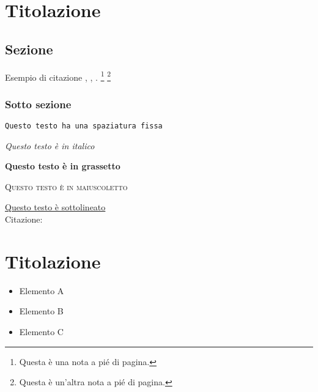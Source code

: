 \documentclass[twoside]{supsistudent}
\begin{document}
\maketitle
\onehalfspacing
\frontmatter


\tableofcontents
\listoffigures					%
\listoftables					%

\newpage
\mainmatter
{}
\setcounter{page}{1}

\chapter{Titolazione}

\lipsum[13]

\section{Sezione}

\lipsum[23]
Esempio di citazione \cite{4538384}, \cite{5357331,4523385}, \cite{1705631}.
\footnote{Questa \`e una nota a pi\'e di pagina.}
\footnote{Questa \`e un'altra nota a pi\'e di pagina.}
\lipsum[23]

\subsection{Sotto sezione}

\texttt{Questo testo ha una spaziatura fissa}

\textit{Questo testo \`e in italico}

\textbf{Questo testo \`e in grassetto}

\textsc{Questo testo \`e in maiuscoletto}

\underline{Questo testo \`e sottolineato} \\

Citazione:
\begin{quote}
\lipsum[23]
\end{quote}

\chapter{Titolazione}

\lipsum[13]

\begin{itemize}
  \item Elemento A
  \item Elemento B
  \item Elemento C
\end{itemize}
\end{document}
